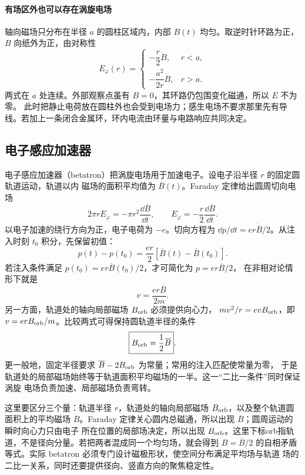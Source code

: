 \paragraph{有场区外也可以存在涡旋电场}
轴向磁场只分布在半径 $a$ 的圆柱区域内，内部 $B(t)$ 均匀。取逆时针环路为正，$B$ 向纸外为正，由对称性
\[
 E_\varphi(r)=\begin{cases}
 -\dfrac r2\dot B,&r<a,\\[3pt]
 -\dfrac{a^2}{2r}\dot B,&r>a.
 \end{cases}
\]
两式在 $a$ 处连续。外部观察点虽有 $B=0$，其环路仍包围变化磁通，所以 $E$ 不为零。
此时把静止电荷放在圆柱外也会受到电场力；感生电场不要求那里先有导线。若加上一条闭合金属环，环内电流由环量与电路响应共同决定。

\subsection{电子感应加速器}

电子感应加速器（betatron）把涡旋电场用于加速电子。设电子沿半径 $r$ 的固定圆轨道运动，轨道以内
磁场的面积平均值为 $\overline B(t)$。Faraday 定律给出圆周切向电场
\begin{equation}
  2\pi rE_\varphi=-\pi r^2\frac{\dd\overline B}{\dd t},
  \qquad
  E_\varphi=-\frac r2\frac{\dd\overline B}{\dd t}.
\end{equation}
以电子加速的绕行方向为正，电子电荷为 $-e$。切向方程为
$\dd p/\dd t=er\dot{\overline B}/2$。从注入时刻 $t_0$ 积分，先保留初值：
\begin{equation}
 p(t)-p(t_0)=\frac{er}{2}[\overline B(t)-\overline B(t_0)].
\end{equation}
若注入条件满足 $p(t_0)=er\overline B(t_0)/2$，才可简化为 $p=er\overline B/2$，
在非相对论情形下就是
\begin{equation}
  v=\frac{er\overline B}{2m}.
\end{equation}
另一方面，轨道处的轴向局部磁场 $B_{\rm orb}$ 必须提供向心力，
$mv^2/r=evB_{\rm orb}$，即 $v=erB_{\rm orb}/m$。比较两式可得保持圆轨道半径的条件
\begin{equation}
  \boxed{B_{\rm orb}=\frac12\overline B}.
\end{equation}
更一般地，固定半径要求 $\overline B-2B_{\rm orb}$ 为常量；常用的注入匹配使常量为零，
于是轨道处的局部磁场始终等于轨道面积平均磁场的一半。这一“二比一条件”同时保证涡旋
电场负责加速、局部磁场负责弯转。

这里要区分三个量：轨道半径 $r$，轨道处的轴向局部磁场 $B_{\rm orb}$，以及整个轨道圆面积上的平均磁场
$\overline B$。Faraday 定律关心圆内总磁通，所以出现 $\overline B$；圆周运动的瞬时向心力只由电子
所在位置的局部场决定，所以出现 $B_{\rm orb}$。这里下标orb指轨道，不是径向分量。若把两者混成同一个均匀场，就会得到
$B=\overline B/2$ 的自相矛盾等式。实际 betatron 必须专门设计磁极形状，使空间分布满足平均场与轨道
场的二比一关系，同时还要提供径向、竖直方向的聚焦稳定性。


